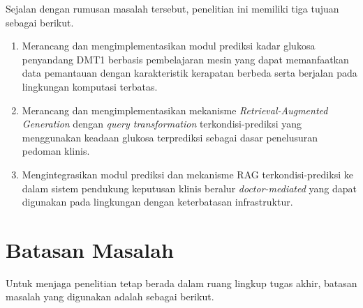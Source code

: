 Sejalan dengan rumusan masalah tersebut, penelitian ini memiliki tiga tujuan sebagai berikut.

\begin{enumerate}
    \item Merancang dan mengimplementasikan modul prediksi kadar glukosa penyandang DMT1 berbasis pembelajaran mesin yang dapat memanfaatkan data pemantauan dengan 
    karakteristik kerapatan berbeda serta berjalan pada lingkungan komputasi terbatas.
    \item Merancang dan mengimplementasikan mekanisme \textit{Retrieval-Augmented Generation} dengan \textit{query transformation} terkondisi-prediksi yang menggunakan keadaan 
    glukosa terprediksi sebagai dasar penelusuran pedoman klinis.
    \item Mengintegrasikan modul prediksi dan mekanisme RAG terkondisi-prediksi ke dalam sistem pendukung keputusan klinis beralur \textit{doctor-mediated} yang dapat digunakan
    pada lingkungan dengan keterbatasan infrastruktur.
\end{enumerate}

\section{Batasan Masalah}
\label{sec:bab1-batasan}

Untuk menjaga penelitian tetap berada dalam ruang lingkup tugas akhir, batasan masalah yang digunakan adalah sebagai berikut.

